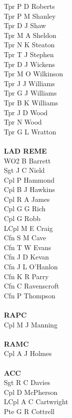\begin{multicols}{4}
  Tpr P D Roberts \\
  Tpr P M Shanley \\
  Tpr D J Shaw \\
  Tpr M A Sheldon \\
  Tpr N K Steaton \\
  Tpr T J Stephen \\
  Tpr D J Wickens \\
  Tpr M O Wilkinson \\
  Tpr J J Williams \\
  Tpr G J Williams \\
  Tpr B K Williams \\
  Tpr J D Wood \\
  Tpr N Wood \\
  Tpr G L Wratton \\
  \\
  \textbf{LAD REME} \\
  WO2 B Barrett \\
  Sgt J C Nield \\
  Cpl P Hammond \\
  Cpl B J Hawkins \\
  Cpl R A James \\
  Cpl G G Rich \\
  Cpl G Robb \\
  LCpl M E Craig \\
  Cfn S M Cave \\
  Cfn T W Evans \\
  Cfn J D Kevan \\
  Cfn J L O'Hanlon \\
  Cfn K R Parry \\
  Cfn C Ravenscroft \\
  Cfn P Thompson \\
  \\
  \textbf{RAPC} \\
  Cpl M J Manning \\
  \\
  \textbf{RAMC} \\
  Cpl A J Holmes \\
  \\
  \textbf{ACC} \\
  Sgt R C Davies \\
  Cpl D McPherson \\
  LCpl A C Cartwright \\
  Pte G R Cottrell
\end{multicols}

\pagebreak
